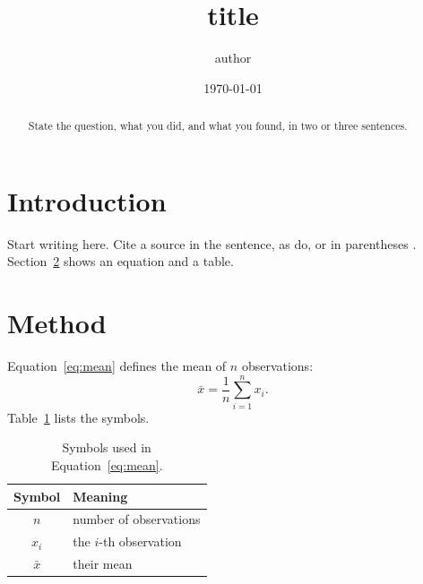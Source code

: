 \documentclass[11pt]{article}
\title{{{title}}}
\author{{{author}}}
\date{\today}
\begin{document}
\maketitle

\begin{abstract}
State the question, what you did, and what you found, in two or three sentences.
\end{abstract}

\section{Introduction}
\label{sec:intro}

Start writing here. Cite a source in the sentence, as \citet{knuth1984literate}
do, or in parentheses \citep{lamport1994latex}. Section~\ref{sec:method} shows an
equation and a table.

\section{Method}
\label{sec:method}

Equation~\eqref{eq:mean} defines the mean of $n$ observations:
\begin{equation}
  \bar{x} = \frac{1}{n} \sum_{i=1}^{n} x_i .
  \label{eq:mean}
\end{equation}
Table~\ref{tab:symbols} lists the symbols.

\begin{table}[ht]
  \centering
  \caption{Symbols used in Equation~\eqref{eq:mean}.}
  \label{tab:symbols}
  \begin{tabular}{cl}
    \toprule
    Symbol    & Meaning \\
    \midrule
    $n$       & number of observations \\
    $x_i$     & the $i$-th observation \\
    $\bar{x}$ & their mean \\
    \bottomrule
  \end{tabular}
\end{table}



\end{document}
